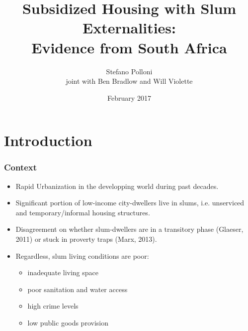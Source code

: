 \documentclass[aspectratio=149]{beamer}
\title{ Subsidized Housing with Slum Externalities: \\ Evidence from South Africa } %
\author{Stefano Polloni \\
joint with Ben Bradlow and Will Violette}
\date{February 2017} %
\begin{document}
\beamertemplatenavigationsymbolsempty

\begin{frame}
\titlepage %
\end{frame}


\section{Introduction}

\begin{frame}
\frametitle{Context}

\begin{itemize}
\item Rapid Urbanization in the developping world during past decades.
\vspace{1mm}
\item Significant portion of low-income city-dwellers live in slums, i.e. unserviced and temporary/informal housing structures.
\vspace{1mm}
\item Disagreement on whether slum-dwellers are in a transitory phase (Glaeser, 2011) or stuck in proverty traps (Marx, 2013). 
\vspace{1mm}
\item Regardless, slum living conditions are poor:
\vspace{1mm}
\begin{itemize}
\item inadequate living space
\item poor sanitation and water access
\item high crime levels
\item low public goods provision


\end{itemize}
\vspace{1mm}
\end{itemize}

\end{frame}
\end{document}
